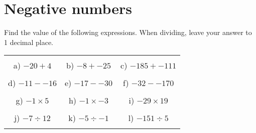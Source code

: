 \documentclass[12pt]{article}
\begin{document}
\pagestyle{fancy}
\fancyfoot{} 
\section{Negative numbers}
Find the value of the following expressions. When dividing, leave your answer to 1 decimal place.
\begin{table}[h!]
\centering
\begin{tabular}{c c c}
\hspace{5cm} & \hspace{5cm} & \hspace{5cm} \\
a) ${-20} + {4}$ & b) ${-8} + {-25}$ & c) ${-185} + {-111}$ \\ \\
d) ${-11} - {-16}$ & e) ${-17} - {-30}$ & f) ${-32} - {-170}$ \\ \\
g) ${-1}\times{5}$ & h) ${-1}\times{-3}$ & i) ${-29}\times{19}$ \\ \\
j) ${-7}\div{12}$ & k) ${-5}\div{-1}$ & l) ${-151}\div{5}$ \\ \\
\end{tabular}
\end{table}
\newline
\end{document}
